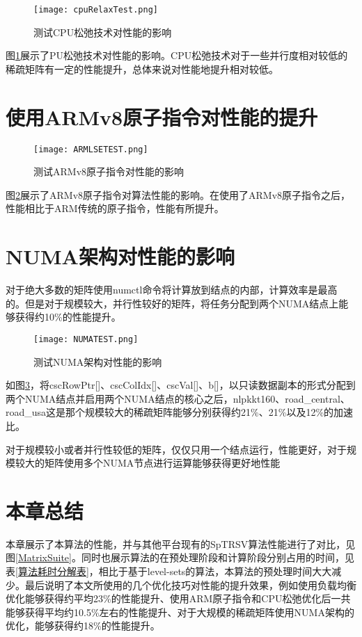 \begin{figure}[htbp]
    \centering
    \texttt{[image: cpuRelaxTest.png]}
    \caption{测试CPU松弛技术对性能的影响}
    \label{测试CPU松弛技术对性能的影响}
\end{figure}

图\ref{测试CPU松弛技术对性能的影响}展示了PU松弛技术对性能的影响。CPU松弛技术对于一些并行度相对较低的稀疏矩阵有一定的性能提升，总体来说对性能地提升相对较低。

\section{使用ARMv8原子指令对性能的提升}

\begin{figure}[htbp]
    \centering
    \texttt{[image: ARMLSETEST.png]}
    \caption{测试ARMv8原子指令对性能的影响}
    \label{测试ARMv8原子指令对性能的影响}
\end{figure}

图\ref{测试ARMv8原子指令对性能的影响}展示了ARMv8原子指令对算法性能的影响。在使用了ARMv8原子指令之后，性能相比于ARM传统的原子指令，性能有所提升。

\section{NUMA架构对性能的影响}\label{NUMA架构对性能的影响}

对于绝大多数的矩阵使用numctl命令将计算放到结点的内部，计算效率是最高的。但是对于规模较大，并行性较好的矩阵，将任务分配到两个NUMA结点上能够获得约10\%的性能提升。

\begin{figure}[htbp]
    \centering
    \texttt{[image: NUMATEST.png]}
    \caption{测试NUMA架构对性能的影响}
    \label{测试NUMA架构对性能的影响}
\end{figure}

如图\ref{测试NUMA架构对性能的影响}，将cscRowPtr[]、cscColIdx[]、cscVal[]、b[]，以只读数据副本的形式分配到两个NUMA结点并启用两个NUMA结点的核心之后，nlpkkt160、road\_central、road\_usa这是那个规模较大的稀疏矩阵能够分别获得约21\%、21\%以及12\%的加速比。

对于规模较小或者并行性较低的矩阵，仅仅只用一个结点运行，性能更好，对于规模较大的矩阵使用多个NUMA节点进行运算能够获得更好地性能

\section{本章总结}

本章展示了本算法的性能，并与其他平台现有的SpTRSV算法性能进行了对比，见图\ref{MatrixSuite}。同时也展示算法的在预处理阶段和计算阶段分别占用的时间，见表\ref{算法耗时分解表}，相比于基于level-sets的算法，本算法的预处理时间大大减少。最后说明了本文所使用的几个优化技巧对性能的提升效果，例如使用负载均衡优化能够获得约平均23\%的性能提升、使用ARM原子指令和CPU松弛优化后一共能够获得平均约10.5\%左右的性能提升、对于大规模的稀疏矩阵使用NUMA架构的优化，能够获得约18\%的性能提升。


\endinput